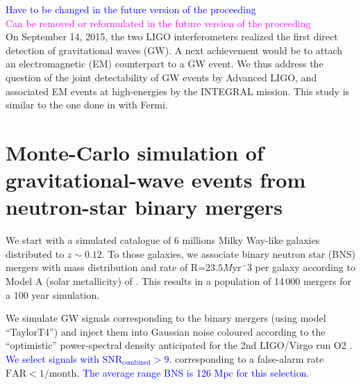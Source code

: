 \documentclass[11pt]{article}
\begin{document}
\textcolor{blue}{Have to be changed in the future version of the proceeding} \\
\textcolor{magenta}{Can be removed or reformulated in the future version of the proceeding} \\
 


On September 14, 2015, the two LIGO interferometers realized the first direct detection of
gravitational waves (GW). A next achievement would be to attach an electromagnetic (EM)
counterpart to a GW event. We thus address the question of the joint detectability 
of GW events by Advanced LIGO, and associated EM events at high-energies by the 
INTEGRAL mission. This study is similar to the one done in \citep{2016arXiv160606124P} with Fermi.

\section*{Monte-Carlo simulation of gravitational-wave events from neutron-star binary mergers}

We start with a simulated catalogue of 6 millions Milky Way-like galaxies
distributed to $z\sim 0.12$. To those galaxies, we associate binary neutron star
(BNS) mergers with mass distribution and rate of R=$23.5 M\mathrm{yr}^-3$ per galaxy
according to Model A (solar metallicity) of
\citep{2012ApJ...759...52D}. This results in a population of 14\,000
mergers for a $100$ year simulation.

We simulate GW signals corresponding to the binary mergers (using model
``TaylorT4'') and inject them into Gaussian noise coloured according to the
``optimistic'' power-spectral density anticipated for the 2nd LIGO/Virgo run O2
\citep{2016LRR....19....1A}. \textcolor{blue}{We select signals with $\mathrm{SNR}_{\mathrm{combined}} > 9$.}
corresponding to a false-alarm rate $\mathrm{FAR} < 1/\mathrm{month}$. \textcolor{blue}{The
average range BNS is 126 Mpc for this selection.}
\end{document}
